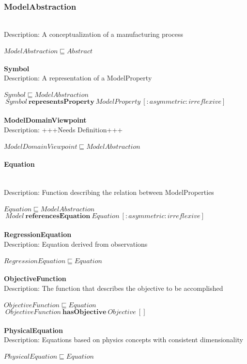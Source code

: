\subsubsection{ModelAbstraction}\\
Description: A conceptualization of a manufacturing process\\
\\$ ModelAbstraction \sqsubseteq Abstract$
\\\\   \textbf{Symbol}\\Description: A representation of a ModelProperty\\
\\$ Symbol \sqsubseteq ModelAbstraction$
\\$\: Symbol\: \textbf{representsProperty}\: ModelProperty\: [:asymmetric :irreflexive]$
\\\\   \textbf{ModelDomainViewpoint}\\Description: +++Needs Definition+++\\
\\$ ModelDomainViewpoint \sqsubseteq ModelAbstraction$
\paragraph{Equation}\\
Description: Function describing the relation between ModelProperties\\
\\$ Equation \sqsubseteq ModelAbstraction$
\\$\: Model\: \textbf{referencesEquation}\: Equation\:  [:asymmetric :irreflexive]$
\\\\   \textbf{RegressionEquation}\\Description: Equation derived from observations\\
\\$ RegressionEquation \sqsubseteq Equation$
\\\\   \textbf{ObjectiveFunction}\\Description: The function that describes the objective to be accomplished\\
\\$ ObjectiveFunction \sqsubseteq Equation$
\\$\: ObjectiveFunction\: \textbf{hasObjective}\: Objective\: []$
\\\\   \textbf{PhysicalEquation}\\Description: Equations based on physics concepts with consistent dimensionality\\
\\$ PhysicalEquation \sqsubseteq Equation$
